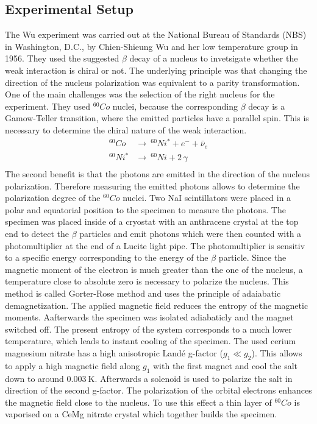 \subsection{Experimental Setup}
The Wu experiment was carried out at the National Bureau of Standards (NBS) in Washington, D.C., by Chien-Shieung Wu and her low temperature group in 1956.
They used the suggested $\beta$ decay of a nucleus to invetsigate whether the weak interaction is chiral or not. The underlying principle was that changing the direction of the nucleus polarization was equivalent to a parity transformation. \\
One of the main challenges was the selection of the right nucleus for the experiment. They used $^{60}Co$ nuclei, because the corresponding $\beta$ decay is a Gamow-Teller transition, where the emitted particles have a parallel spin. This is necessary to determine the chiral nature of the weak interaction.
\begin{align*}
  ^{60}Co &\rightarrow \ ^{60}Ni^{*} + e^- + \bar{\nu}_e \label{eqn:kobalt-zerfall}\\
  ^{60}Ni^{*} & \rightarrow \ ^{60}Ni + 2 \, \gamma \\
\end{align*}
The second benefit is that the photons are emitted in the direction of the nucleus polarization. Therefore measuring the emitted photons allows to determine the polarization degree of the $^{60}Co$ nuclei. Two NaI scintillators were placed in a polar and equatorial position to the specimen to measure the photons. The specimen was placed inside of a cryostat with an anthracene crystal at the top end to detect the $\beta$ particles and emit photons which were then counted with a photomultiplier at the end of a Lucite light pipe. The photomultiplier is sensitiv to a specific energy corresponding to the energy of the $\beta$ particle.
Since the magnetic moment of the electron is much greater than the one of the nucleus, a temperature close to absolute zero is necessary to polarize the nucleus. This method is called Gorter-Rose method and uses the principle of adaiabatic demagnetization. The applied magnetic field reduces the entropy of the magnetic moments. Aafterwards the specimen was isolated adiabaticly and the magnet switched off. The present entropy of the system corresponds to a much lower temperature, which leads to instant cooling of the specimen. The used cerium magnesium nitrate has a high anisotropic Landé g-factor ($g_1 \ll g_2$). This allows to apply a high magnetic field along $g_1$ with the first magnet and cool the salt down to around $\SI{0.003}{\kelvin}$. Afterwards a solenoid is used to polarize the salt in direction of the second g-factor. The polarization of the orbital electrons enhances the magnetic field close to the nucleus. To use this effect a thin layer of $^{60}Co$ is vaporised on a CeMg nitrate crystal which together builds the specimen.
